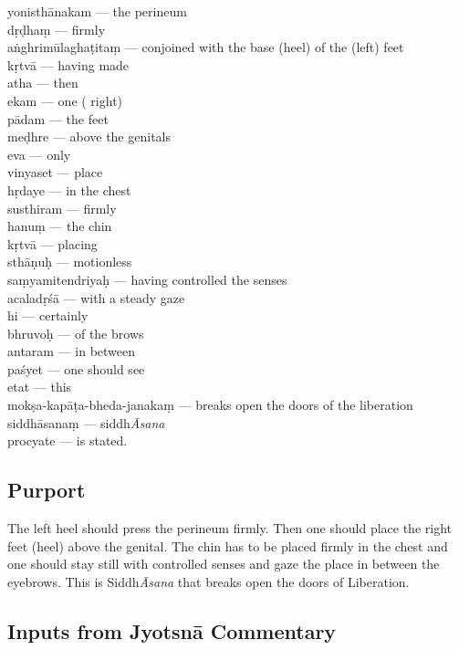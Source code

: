 \begin{multicols}{2}
yonisthānakam --- the perineum \\
dṛḍhaṃ --- firmly  \\
aṅghrimūlaghaṭitaṃ --- conjoined with the base (heel) of the (left) feet  \\
kṛtvā --- having made \\
atha --- then\\
ekam --- one ( right)  \\
pādam --- the feet \\
meḍhre --- above the genitals \\
eva --- only \\
vinyaset --- place \\
hṛdaye --- in the chest \\
susthiram --- firmly \\
hanuṃ --- the chin \\
kṛtvā --- placing \\
sthāṇuḥ --- motionless\\
saṃyamitendriyaḥ --- having controlled the senses  \\
acaladṛśā  --- with a  steady gaze  \\
hi --- certainly \\
bhruvoḥ --- of the brows  \\
antaram  --- in between \\
paśyet --- one should see \\
etat --- this  \\
mokṣa-kapāṭa-bheda-janakaṃ --- breaks open the doors of the liberation \\
siddhāsanaṃ --- siddh\textit{Āsana} \\
procyate --- is stated. 
\end{multicols}

\subsection*{Purport}

The left heel should press the perineum firmly. Then one should place the right feet (heel) above the genital.  The chin has to be placed firmly in the chest and one should stay still with controlled senses and gaze the place in between the eyebrows. This is Siddh\textit{Āsana} that breaks open the doors of Liberation.

\subsection*{Inputs from Jyotsnā Commentary}

